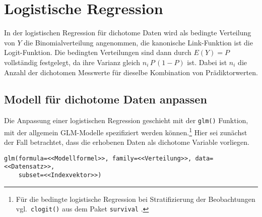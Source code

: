 \section{Logistische Regression}
\label{sec:regrLog}

In der logistischen Regression für dichotome Daten wird als bedingte Verteilung von $Y$ die Binomialverteilung angenommen, die kanonische Link-Funktion ist die Logit-Funktion. Die bedingten Verteilungen sind dann durch $E(Y) = P$ vollständig festgelegt, da ihre Varianz gleich $n_{i} \, P \, (1-P)$ ist. Dabei ist $n_{i}$ die Anzahl der dichotomen Messwerte für dieselbe Kombination von Prädiktorwerten.

\subsection{Modell für dichotome Daten anpassen}
\label{sec:glmFit}

Die Anpassung einer logistischen Regression geschieht mit der \lstinline!glm()! Funktion, mit der allgemein GLM-Modelle spezifiziert werden können.\footnote{Für die bedingte logistische Regression bei Stratifizierung der Beobachtungen vgl.\ \lstinline!clogit()! aus dem Paket  \lstinline!survival! \cite{Therneau2012a}.} Hier sei zunächst der Fall betrachtet, dass die erhobenen Daten als dichotome Variable vorliegen.
\begin{lstlisting}
glm(formula=<<Modellformel>>, family=<<Verteilung>>, data=<<Datensatz>>,
    subset=<<Indexvektor>>)
\end{lstlisting}

